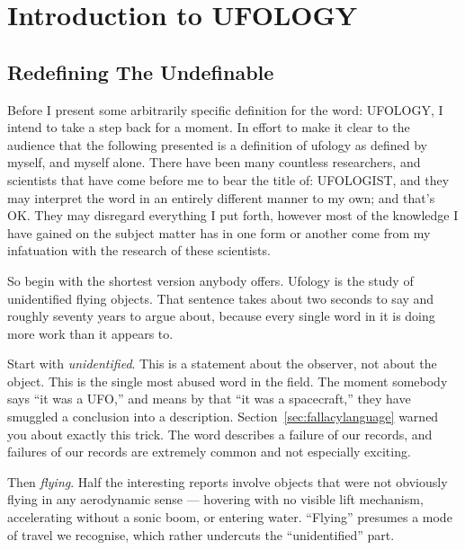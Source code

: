 \chapter{Introduction to UFOLOGY}\label{ch:intro}


\section{Redefining The Undefinable}\label{sec:redefiningundefinable}

Before I present some arbitrarily specific definition for the word: UFOLOGY, I
intend to take a step back for a moment. In effort to make it clear to the
audience that the following presented is a definition of ufology as defined by
myself, and myself alone. There have been many countless researchers, and
scientists that have come before me to bear the title of: UFOLOGIST, and they may
interpret the word in an entirely different manner to my own; and that's OK. They
may disregard everything I put forth, however most of the knowledge I have gained
on the subject matter has in one form or another come from my infatuation with the
research of these scientists.

So begin with the shortest version anybody offers. Ufology is the study of
unidentified flying objects. That sentence takes about two
seconds to say and roughly seventy years to argue about, because every single word in
it is doing more work than it appears to.

Start with \emph{unidentified}. This is a statement about the observer, not about the
object.  This is the
single most abused word in the field. The moment somebody says ``it was a UFO,'' and
means by that ``it was a spacecraft,'' they have smuggled a conclusion into a
description. Section~\ref{sec:fallacylanguage} warned you about exactly this trick. The word describes a
failure of our records, and failures of our records are extremely common and not
especially exciting.

Then \emph{flying}. Half the interesting reports involve objects that were not
obviously flying in any aerodynamic sense --- hovering with no visible lift mechanism,
accelerating without a sonic boom, or entering water. ``Flying'' presumes a mode of
travel we recognise, which rather undercuts the ``unidentified'' part.

